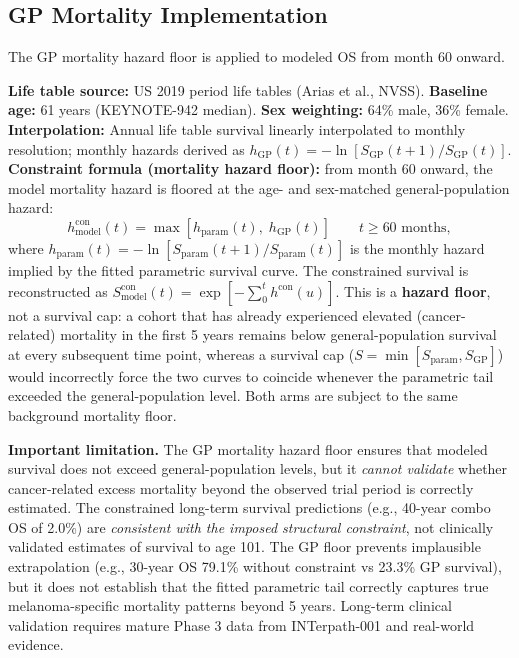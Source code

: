\documentclass[11pt,a4paper]{article}
\begin{document}
\subsection{GP Mortality Implementation}
\label{sec:gp_impl}
The GP mortality hazard floor is applied to modeled OS from month 60 onward.

\textbf{Life table source:} US 2019 period life tables (Arias et al., NVSS).
\textbf{Baseline age:} 61 years (\mbox{KEYNOTE-942} median). \textbf{Sex weighting:} 64\% male, 36\% female.
\textbf{Interpolation:} Annual life table survival linearly interpolated to monthly resolution; monthly hazards derived as $h_{\text{GP}}(t) = -\ln[S_{\text{GP}}(t{+}1)/S_{\text{GP}}(t)]$.
\textbf{Constraint formula (mortality hazard floor):} from month 60 onward, the model mortality hazard is floored at the age- and sex-matched general-population hazard:
\begin{equation}
    h_{\text{model}}^{\text{con}}(t) = \max\left[h_{\text{param}}(t),\; h_{\text{GP}}(t)\right] \qquad t \geq 60 \text{ months},
\end{equation}
where $h_{\text{param}}(t) = -\ln[S_{\text{param}}(t{+}1)/S_{\text{param}}(t)]$ is the monthly hazard implied by the fitted parametric survival curve. The constrained survival is reconstructed as $S_{\text{model}}^{\text{con}}(t) = \exp[-\sum_{0}^{t} h^{\text{con}}(u)]$. This is a \textbf{hazard floor}, not a survival cap: a cohort that has already experienced elevated (cancer-related) mortality in the first 5 years remains below general-population survival at every subsequent time point, whereas a survival cap ($S = \min[S_{\text{param}}, S_{\text{GP}}]$) would incorrectly force the two curves to coincide whenever the parametric tail exceeded the general-population level. Both arms are subject to the same background mortality floor.

\noindent \textbf{Important limitation.} The GP mortality hazard floor ensures that modeled survival does not exceed general-population levels, but it \textit{cannot validate} whether cancer-related excess mortality beyond the observed trial period is correctly estimated. The constrained long-term survival predictions (e.g., 40-year combo OS of 2.0\%) are \textit{consistent with the imposed structural constraint}, not clinically validated estimates of survival to age 101. The GP floor prevents implausible extrapolation (e.g., 30-year OS 79.1\% without constraint vs 23.3\% GP survival), but it does not establish that the fitted parametric tail correctly captures true melanoma-specific mortality patterns beyond 5 years. Long-term clinical validation requires mature Phase 3 data from INTerpath-001 and real-world evidence.
\end{document}
